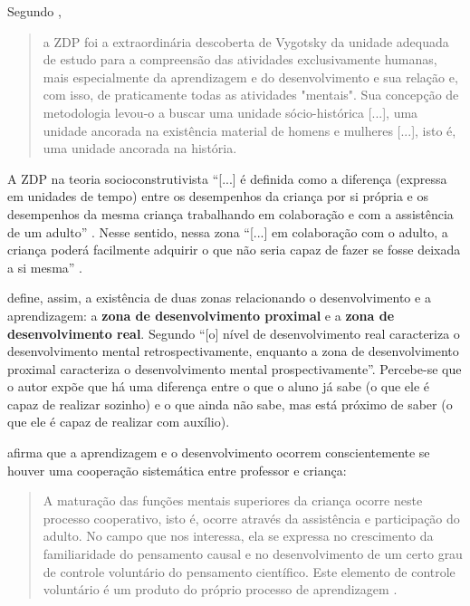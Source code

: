 \documentclass{textolivre}
\begin{document}
Segundo \textcite[p. 81]{newman2002}, 

\begin{quote}
a ZDP foi a extraordinária descoberta de Vygotsky da unidade adequada de estudo para a compreensão das atividades exclusivamente humanas, mais especialmente da aprendizagem e do desenvolvimento e sua relação e, com isso, de praticamente todas as atividades "mentais". Sua concepção de metodologia levou-o a buscar uma unidade sócio-histórica [...], uma unidade ancorada na existência material de homens e mulheres [...], isto é, uma unidade ancorada na história.
\end{quote}

A ZDP na teoria socioconstrutivista “[...] é definida como a diferença (expressa em unidades de tempo) entre os desempenhos da criança por si própria e os desempenhos da mesma criança trabalhando em colaboração e com a assistência de um adulto” \cite[p. 32]{ivic2010}. Nesse sentido, nessa zona “[...] em colaboração com o adulto, a criança poderá facilmente adquirir o que não seria capaz de fazer se fosse deixada a si mesma” \cite[p. 33]{ivic2010}. 

\textcite{vygotski1991} define, assim, a existência de duas zonas relacionando o desenvolvimento e a aprendizagem: a \textbf{zona de desenvolvimento proximal} e a \textbf{zona de desenvolvimento real}. Segundo \textcite[p. 97]{vygotski1991} “[o] nível de desenvolvimento real caracteriza o desenvolvimento mental retrospectivamente, enquanto a zona de desenvolvimento proximal caracteriza o desenvolvimento mental prospectivamente”. Percebe-se que o autor expõe que há uma diferença entre o que o aluno já sabe (o que ele é capaz de realizar sozinho) e o que ainda não sabe, mas está próximo de saber (o que ele é capaz de realizar com auxílio).

\textcite{vygotski1991} afirma que a aprendizagem e o desenvolvimento ocorrem conscientemente se houver uma cooperação sistemática entre professor e criança:

\begin{quote}
A maturação das funções mentais superiores da criança ocorre neste processo cooperativo, isto é, ocorre através da assistência e participação do adulto. No campo que nos interessa, ela se expressa no crescimento da familiaridade do pensamento causal e no desenvolvimento de um certo grau de controle voluntário do pensamento científico. Este elemento de controle voluntário é um produto do próprio processo de aprendizagem \cite[p. 169]{vygotski1991}.
\end{quote}
\end{document}
